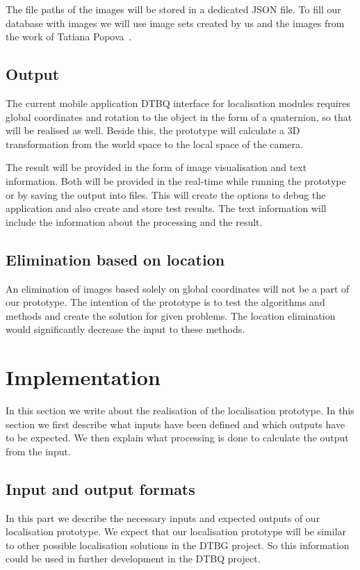\documentclass[thesis=B,english]{FITthesis}[2019/12/23]
\begin{document}
        The file paths of the images will be stored in a dedicated JSON file. To fill our database with images we will use image sets created by us and the images from the work of Tatiana Popova~\cite{Popova2021}.
        
        \subsection{Output}
        The current mobile application DTBQ interface for localisation modules requires global coordinates and rotation to the object in the form of a quaternion, so that will be realised as well. Beside this, the prototype will calculate a 3D transformation from the world space to the local space of the camera.

        The result will be provided in the form of image visualisation and text information. Both will be provided in the real-time while running the prototype or by saving the output into files. This will create the options to debug the application and also create and store test results. The text information will include the information about the processing and the result.
        
        \subsection{Elimination based on location}
        An elimination of images based solely on global coordinates will not be a part of our prototype. The intention of the prototype is to test the algorithms and methods and create the solution for given problems. The location elimination would significantly decrease the input to these methods.

    \section{Implementation}
        In this section we write about the realisation of the localisation prototype. In this section we first describe what inputs have been defined and which outputs have to be expected. We then explain what processing is done to calculate the output from the input.

        \subsection{Input and output formats}\label{sec:InputOutputFormats}
            In this part we describe the necessary inputs and expected outputs of our localisation prototype. We expect that our localisation prototype will be similar to other possible localisation solutions in the DTBG project. So this information could be used in further development in the DTBQ project.
\end{document}
